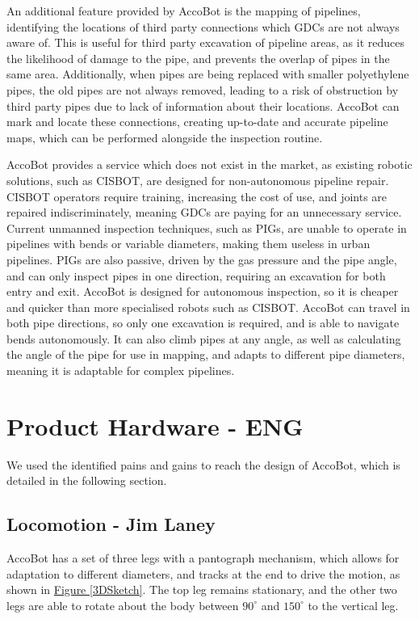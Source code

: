 \documentclass[11pt]{article}		%
\newcommand{\figref}[1]{\hyperref[#1]{Figure \ref*{#1}}}    %
\begin{document}
		An additional feature provided by AccoBot is the mapping of pipelines, identifying the locations of third party connections which GDCs are not always aware of.
		This is useful for third party excavation of pipeline areas, as it reduces the likelihood of damage to the pipe, and prevents the overlap of pipes in the same area.
		Additionally, when pipes are being replaced with smaller polyethylene pipes, the old pipes are not always removed, leading to a risk of obstruction by third party pipes due to lack of information about their locations.
		AccoBot can mark and locate these connections, creating up-to-date and accurate pipeline maps, which can be performed alongside the inspection routine.
		
		AccoBot provides a service which does not exist in the market, as existing robotic solutions, such as CISBOT, are designed for non-autonomous pipeline repair.
		CISBOT operators require training, increasing the cost of use, and joints are repaired indiscriminately, meaning GDCs are paying for an unnecessary service.
		Current unmanned inspection techniques, such as PIGs, are unable to operate in pipelines with bends or variable diameters, making them useless in urban pipelines.
		PIGs are also passive, driven by the gas pressure and the pipe angle, and can only inspect pipes in one direction, requiring an excavation for both entry and exit.
		AccoBot is designed for autonomous inspection, so it is cheaper and quicker than more specialised robots such as CISBOT.
		AccoBot can travel in both pipe directions, so only one excavation is required, and is able to navigate bends autonomously.
		It can also climb pipes at any angle, as well as calculating the angle of the pipe for use in mapping, and adapts to different pipe diameters, meaning it is adaptable for complex pipelines.
				
		\section{Product Hardware - ENG}
		
		We used the identified pains and gains to reach the design of AccoBot, which is detailed in the following section.
	
		\subsection[Locomotion]{Locomotion - Jim Laney} \label{Lomcotion}
		
			AccoBot has a set of three legs with a pantograph mechanism, which allows for adaptation to different diameters, and tracks at the end to drive the motion, as shown in \figref{3DSketch}.
			The top leg remains stationary, and the other two legs are able to rotate about the body between $90^\circ$ and $150^\circ$ to the vertical leg.
			
\end{document}
